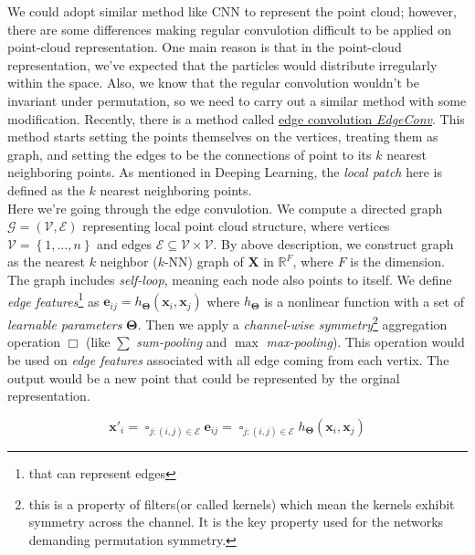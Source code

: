 \documentclass[12pt]{article}
\numberwithin{equation}{section}
\begin{document}
We could adopt similar method like CNN to represent the point cloud; however, there are some differences making regular convulotion difficult to be applied on point-cloud representation. One main reason is that in the point-cloud representation, we've expected that the particles would distribute irregularly within the space. Also, we know that the regular convolution wouldn't be invariant under permutation, so we need to carry out a similar method with some modification. Recently, there is a method called \href{chrome-extension://efaidnbmnnnibpcajpcglclefindmkaj/https://dl.acm.org/doi/pdf/10.1145/3326362}{edge convolution \textit{EdgeConv}}. This method starts setting the points themselves on the vertices, treating them as graph, and setting the edges to be the connections of point to its $k$ nearest neighboring points. As mentioned in Deeping Learning, the \textit{local patch} here is defined as the $k$ nearest neighboring points. 
\\
\indent Here we're going through the edge convulotion. We compute a directed graph $\mathcal{G} = \left(\mathcal{V}, \mathcal{E}\right)$ representing local point cloud structure, where vertices $\mathcal{V} = \left\{1, \hdots, n\right\}$ and edges $\mathcal{E} \subseteq \mathcal{V} \times \mathcal{V}$. By above description, we construct graph as the nearest $k$ neighbor ($k$-NN) graph of $\mathbf{X}$ in $\mathbb{R}^F$, where $F$ is the dimension. The graph includes \textit{self-loop}, meaning each node also points to itself. We define \textit{edge features}\footnote{that can represent edges} as $\pmb{e}_{ij} = h_{\pmb{\Theta}}(\mathbf{x}_i, \mathbf{x}_j)$ where $h_{\pmb{\Theta}}$ is a nonlinear function with a set of \textit{learnable parameters} $\pmb{\Theta}$. Then we apply a \textit{channel-wise symmetry}\footnote{this is a property of filters(or called kernels) which mean the kernels exhibit symmetry across the channel. It is the key property used for the networks demanding permutation symmetry.} aggregation operation $\Box$ (like $\sum$ \textit{sum-pooling} and $\max$ \textit{max-pooling}). This operation would be used on \textit{edge features} associated with all edge coming from each vertix. The output would be a new point that could be represented by the orginal representation.

\begin{equation}
    \mathbf{x}'_i = \mathop{\square}_{j:(i, j) \in \mathcal{E}} \pmb{e}_{ij} = \mathop{\square}_{j:(i, j) \in \mathcal{E}}h_{\pmb{\Theta}}(\mathbf{x}_i, \mathbf{x}_j)
\end{equation}
\end{document}

